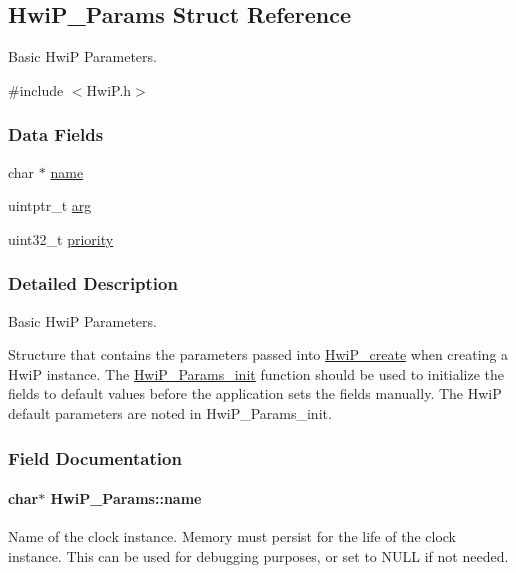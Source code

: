 \subsection{Hwi\+P\+\_\+\+Params Struct Reference}
\label{struct_hwi_p___params}


Basic Hwi\+P Parameters.  




{\ttfamily \#include $<$Hwi\+P.\+h$>$}

\subsubsection*{Data Fields}
\begin{DoxyCompactItemize}
\item 
char $\ast$ \hyperlink{struct_hwi_p___params_a4af0aabe86da85ef5912f697aa4ec9a1}{name}
\item 
uintptr\+\_\+t \hyperlink{struct_hwi_p___params_ae59e7df38314177a3817f11cfad0ce26}{arg}
\item 
uint32\+\_\+t \hyperlink{struct_hwi_p___params_ac4977525e0bda265e8bbe2980dc16eda}{priority}
\end{DoxyCompactItemize}


\subsubsection{Detailed Description}
Basic Hwi\+P Parameters. 

Structure that contains the parameters passed into \hyperlink{_hwi_p_8h_a3d80df47f0bdcbb6e562ee7b96a40af5}{Hwi\+P\+\_\+create} when creating a Hwi\+P instance. The \hyperlink{_hwi_p_8h_a33f02161b1837b41f08ba064f1001045}{Hwi\+P\+\_\+\+Params\+\_\+init} function should be used to initialize the fields to default values before the application sets the fields manually. The Hwi\+P default parameters are noted in Hwi\+P\+\_\+\+Params\+\_\+init. 

\subsubsection{Field Documentation}
\paragraph[{name}]{\setlength{\rightskip}{0pt plus 5cm}char$\ast$ Hwi\+P\+\_\+\+Params\+::name}\label{struct_hwi_p___params_a4af0aabe86da85ef5912f697aa4ec9a1}
Name of the clock instance. Memory must persist for the life of the clock instance. This can be used for debugging purposes, or set to N\+U\+L\+L if not needed. 
